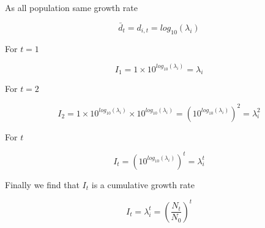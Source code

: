 \documentclass[A4,7pt]{article}
\begin{document}
As all population same growth rate

\begin{equation}
  \label{eq:d_bar2}
    \bar{d}_t = d_{i,t} = log_{10}\left(\lambda_i\right)
\end{equation}

For $t=1$

\begin{equation}
  \label{eq:I1}
  I_1 = 1 \times 10^{log_{10}\left(\lambda_i\right)} = \lambda_i
\end{equation}

For $t=2$

\begin{equation}
  \label{eq:I2}
  I_2 = 1 \times 10^{log_{10}\left(\lambda_i\right)} \times
    10^{log_{10}\left(\lambda_i\right)} =
    \left(10^{log_{10}\left(\lambda_i\right)}\right)^2 = \lambda_i^2
\end{equation}

For $t$


\begin{equation}
  \label{eq:It}
  I_t = \left(10^{log_{10}\left(\lambda_i\right)}\right)^t = \lambda_i^t
    \end{equation}

Finally we find that $I_t$ is a cumulative growth rate 

\begin{equation}
  \label{eq:It}
  I_t  = \lambda_i^t = \left( \frac{N_t}{N_0} \right)^t
    \end{equation}


  
    
    
\end{document}
